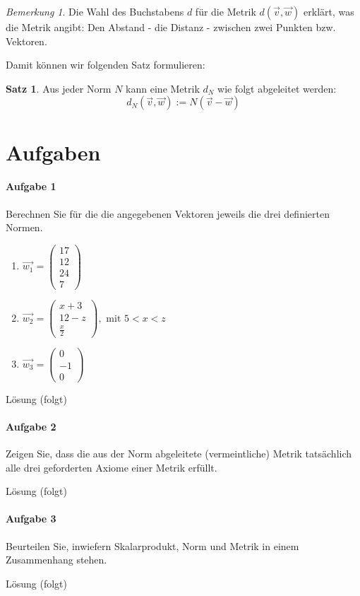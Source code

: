 \documentclass[11pt,a4paper]{scrartcl}
\theoremstyle{remark}
\newtheorem{note}{Bemerkung}
\theoremstyle{definition}
\newtheorem{satz}{Satz}[section]
\begin{document}
\begin{note}
Die Wahl des Buchstabens $d$ für die Metrik $d(\vec{v}, \vec{w})$ erklärt, was die Metrik angibt: Den Abstand - die Distanz - zwischen zwei Punkten bzw. Vektoren.
\end{note}
Damit können wir folgenden Satz formulieren:
\begin{satz}
Aus jeder Norm $N$ kann eine Metrik $d_N$ wie folgt abgeleitet werden:
\[d_N (\vec{v}, \vec{w}) := N(\vec{v} - \vec{w})\]
\end{satz}
\pagebreak
\section*{Aufgaben}
\paragraph{Aufgabe 1} Berechnen Sie für die die angegebenen Vektoren jeweils die drei definierten Normen.
\begin{enumerate}
\item $\vec{w_1} = \left( \begin{matrix} 17 \\ 12 \\ 24 \\ 7\end{matrix} \right)$
\item $\vec{w_2} = \left( \begin{matrix} x+3 \\ 12-z \\ \frac{x}{2} \end{matrix} \right), \text{ mit } 5 < x < z$
\item $\vec{w_3} = \left( \begin{matrix} 0 \\ -1 \\ 0 \end{matrix} \right)$
\end{enumerate}
\begin{flushright}
Lösung (folgt)
\end{flushright}
\paragraph{Aufgabe 2} Zeigen Sie, dass die aus der Norm abgeleitete (vermeintliche) Metrik tatsächlich alle drei geforderten Axiome einer Metrik erfüllt.
\begin{flushright}
Lösung (folgt)
\end{flushright}
\paragraph{Aufgabe 3} Beurteilen Sie, inwiefern Skalarprodukt, Norm und Metrik in einem Zusammenhang stehen.
\begin{flushright}
Lösung (folgt)
\end{flushright}
\end{document}
